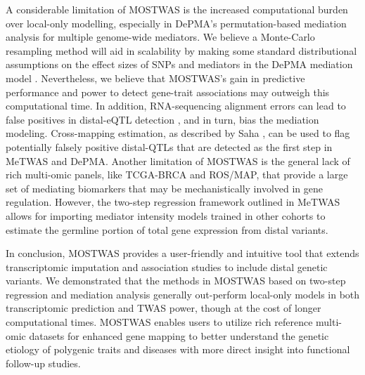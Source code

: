 A considerable limitation
of MOSTWAS is the 
increased computational burden
over local-only modelling, especially
in DePMA's permutation-based mediation
analysis for multiple genome-wide mediators.
We believe a Monte-Carlo resampling
method will aid
in scalability by making 
some standard
distributional assumptions
on the effect sizes of
SNPs and mediators in the DePMA
mediation model
\cite{Preacher2012AdvantagesEffects}.
Nevertheless, we believe that MOSTWAS's gain
in predictive performance 
and power to detect gene-trait associations
may outweigh this computational time.
In addition,
RNA-sequencing alignment errors
can lead to false positives in
distal-eQTL detection \cite{Saha2019FalseApproved}, 
and in turn,
bias the mediation modeling.
Cross-mapping estimation, as
described by Saha \etal{} \cite{Saha2019FalseApproved},
can be used to flag potentially falsely
positive distal-QTLs that are detected
as the first step in MeTWAS and DePMA.
Another limitation of MOSTWAS is
the general lack of rich multi-omic
panels, like TCGA-BRCA and ROS/MAP,
that provide a large set of
mediating biomarkers that
may be mechanistically involved
in gene regulation.
However, the two-step regression
framework outlined in MeTWAS
allows for importing
mediator intensity models
trained in other cohorts
to estimate
the germline portion
of total gene expression from
distal variants.

In conclusion,  
MOSTWAS provides a user-friendly
and intuitive tool that extends 
transcriptomic imputation and
association studies to include
distal genetic variants. 
We demonstrated that the methods
in MOSTWAS based on
two-step regression and mediation
analysis generally out-perform
local-only models in
both transcriptomic prediction and TWAS power,
though at the cost of longer computational times.
MOSTWAS enables users to utilize rich reference multi-omic 
datasets for enhanced gene 
mapping to better understand 
the genetic etiology of polygenic traits
and diseases with more direct insight into
functional follow-up studies.